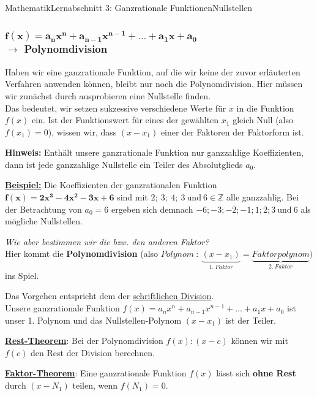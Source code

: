 \documentclass[11pt,twocolumn,oneside,openany,headings=optiontotoc,11pt,numbers=noenddot]{article}
\begin{document}
\begin{worksheet}{Mathematik}{Lernabschnitt 3: Ganzrationale Funktionen}{Nullstellen}
		\subsubsection{\(\mathbf{f(x) = a_nx^n + a_{n-1}x^{n-1} + \ldots{}+a_1x + a_0}\)\\\( \rightarrow \) Polynomdivision}
		Haben wir eine ganzrationale Funktion, auf die wir keine der zuvor erläuterten Verfahren anwenden können, bleibt nur noch die Polynomdivision. Hier müssen wir zunächst durch ausprobieren eine Nullstelle finden.\\
		Das bedeutet, wir setzen sukzessive verschiedene Werte für \(x\) in die Funktion \(f(x)\) ein. Ist der Funktionswert für eines der gewählten \(x_1\) gleich Null (also \(f(x_1) = 0\)), wissen wir, dass \((x-x_1)\) einer der Faktoren der Faktorform ist.
		\begin{framed}
			\noindent
			\textbf{Hinweis:} Enthält unsere ganzrationale Funktion nur ganzzahlige Koeffizienten, dann ist jede ganzzahlige Nullstelle ein Teiler des Absolutglieds \(a_0\).
		\end{framed}
		\noindent
		\textbf{\underline{Beispiel:}} Die Koeffizienten der ganzrationalen Funktion \(\mathbf{f(x) = 2x^3-4x^2-3x+6}\) sind mit \(2;\ 3;\ 4;\ 3\ \text{und}\ 6 \in \mathbb{Z}\) alle ganzzahlig. Bei der Betrachtung von \(a_0=6\) ergeben sich demnach \(-6; -3; -2; -1; 1; 2; 3\ \text{und}\ 6\) als mögliche Nullstellen.\\
		\par\noindent
		\textit{Wie aber bestimmen wir die bzw. den anderen Faktor?}\\
		Hier kommt die \textbf{Polynomdivision} (also \(Polynom\ :\ \underbrace{(x-x_1)}_{1.\ Faktor} = \underbrace{Faktorpolynom}_{2.\ Faktor})\) ins Spiel.\\
		\par\noindent
		Das Vorgehen entspricht dem der \underline{schriftlichen Division}.\\
		Unsere ganzrationale Funktion \(f(x) = a_nx^n + a_{n-1}x^{n-1}+\ldots{}+a_1x + a_0\) ist unser 1. Polynom und das \grq{}Nullstellen-Polynom\grq{} \((x-x_1)\) ist der Teiler.
		\begin{framed}
			\noindent
			\underline{\textbf{Rest-Theorem}}: Bei der Polynomdivision \(f(x):(x-c)\) können wir mit \(f(c)\) den Rest der Division berechnen.\\
			\par\noindent
			\underline{\textbf{Faktor-Theorem}}: Eine ganzrationale Funktion \(f(x)\) lässt sich \textbf{ohne Rest} durch \((x-N_1)\) teilen, wenn \(f(N_1) = 0\).\\

\end{framed}
\end{worksheet}
\end{document}
